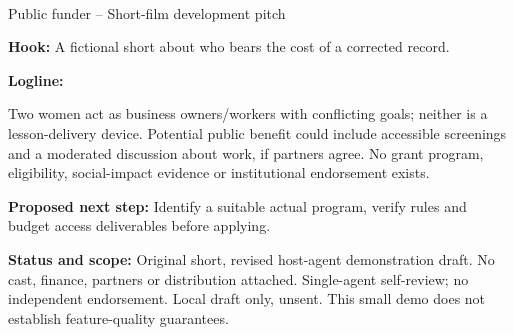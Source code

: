 \documentclass[11pt,letterpaper]{article}
\begin{document}
\begin{center}
{\Large\bfseries\sffamily \filmtitleupper}\\[6pt]
Public funder -- Short-film development pitch
\end{center}
\textbf{Hook:} A fictional short about who bears the cost of a corrected record.

\textbf{Logline:} \filmlogline

Two women act as business owners/workers with conflicting goals; neither is a lesson-delivery device. Potential public benefit could include accessible screenings and a moderated discussion about work, if partners agree. No grant program, eligibility, social-impact evidence or institutional endorsement exists.

\textbf{Proposed next step:} Identify a suitable actual program, verify rules and budget access deliverables before applying.

\textbf{Status and scope:} Original short, revised host-agent demonstration draft. No cast, finance, partners or distribution attached. Single-agent self-review; no independent endorsement. Local draft only, unsent. This small demo does not establish feature-quality guarantees.
\end{document}
